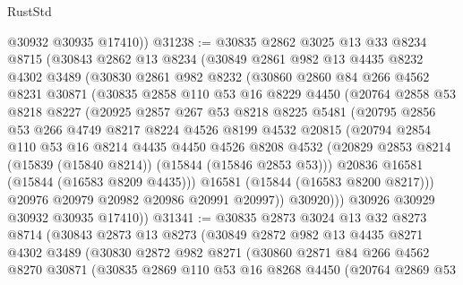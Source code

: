 \begin{lexlean}{RustStd}
\begin{coremodule}
        @30932
        @30935
        @17410))
@31238 := @30835
    @2862
    @3025
    @13
    @33
    @8234
    @8715
    (@30843
      @2862
      @13
      @8234
      (@30849
        @2861
        @982
        @13
        @4435
        @8232
        @4302
        @3489
        (@30830
          @2861
          @982
          @8232
          (@30860
            @2860
            @84
            @266
            @4562
            @8231
            @30871
            (@30835
              @2858
              @110
              @53
              @16
              @8229
              @4450
              (@20764
                @2858
                @53
                @8218
                @8227
                (@20925
                  @2857
                  @267
                  @53
                  @8218
                  @8225
                  @5481
                  (@20795
                    @2856
                    @53
                    @266
                    @4749
                    @8217
                    @8224
                    @4526
                    @8199
                    @4532
                    @20815
                    (@20794
                      @2854
                      @110
                      @53
                      @16
                      @8214
                      @4435
                      @4450
                      @4526
                      @8208
                      @4532
                      (@20829 @2853 @8214 (@15839 (@15840 @8214)) (@15844 (@15846 @2853 @53)))
                      @20836
                      @16581
                      (@15844 (@16583 @8209 @4435)))
                    @16581
                    (@15844 (@16583 @8200 @8217)))
                  @20976
                  @20979
                  @20982
                  @20986
                  @20991
                  @20997))
              @30920)))
        @30926
        @30929
        @30932
        @30935
        @17410))
@31341 := @30835
    @2873
    @3024
    @13
    @32
    @8273
    @8714
    (@30843
      @2873
      @13
      @8273
      (@30849
        @2872
        @982
        @13
        @4435
        @8271
        @4302
        @3489
        (@30830
          @2872
          @982
          @8271
          (@30860
            @2871
            @84
            @266
            @4562
            @8270
            @30871
            (@30835
              @2869
              @110
              @53
              @16
              @8268
              @4450
              (@20764
                @2869
                @53

\end{coremodule}
\end{lexlean}
